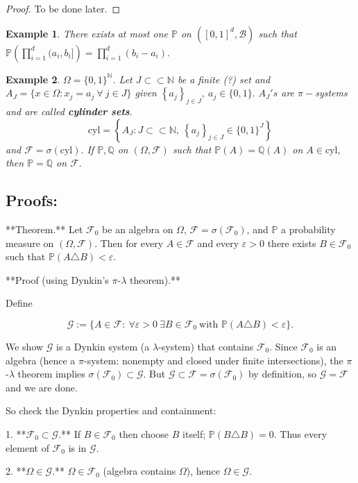 \documentclass{article}
\newcommand{\1}{\mathds{1}}
\newcommand{\Q}{\mathbb{Q}}
\newcommand{\N}{\mathbb{N}}
\newcommand{\F}{\mathcal{F}}
\newcommand{\B}{\mathcal{B}}
\newcommand{\PB}{\mathbb{P}}
\newcommand{\lf}{\left}
\newcommand{\rg}{\right}
\newcommand{\en}[3]{\lf\{{#1}_{#2}\rg\}_{#2\in #3}}
\newtheorem{example}{Example}
\begin{document}
\begin{proof}
   To be done later.
\end{proof}
\begin{example}
There exists at most one $\PB$ on $([0,1]^d,\B)$ such that $\PB\lf(\prod_{i=1}^d(a_i,b_i]\rg)=\prod_{i=1}^d(b_i-a_i).$
\end{example}
\begin{example}
$\Omega=\{0,1\}^\N.$ Let $J\subset\subset \N$ be a finite (?) set and $A_J=\{x\in\Omega:x_j=a_j\ \forall\ j\in J\}$ given $\en ajJ,\ a_j\in\{0,1\}.$
$A_J's$ are $\pi-$systems and are called \textbf{cylinder sets}. $$\text{cyl}=\lf\{A_J:J\subset\subset\N,\ \en ajJ\in\{0,1\}^J\rg\}$$ and $\F=\sigma(\text{cyl}).$ If $\PB,\Q$ on $(\Omega,\F)$ such that $\PB(A)=\Q(A)$ on $A\in\text{cyl},$ then $\PB=\Q$ on $\F.$
\end{example}
\subsection{Proofs:}
**Theorem.**
Let $\mathcal F_0$ be an algebra on $\Omega$, $\mathcal F=\sigma(\mathcal F_0)$, and $\mathbb P$ a probability measure on $(\Omega,\mathcal F)$. Then for every $A\in\mathcal F$ and every $\varepsilon>0$ there exists $B\in\mathcal F_0$ such that $\mathbb P(A\triangle B)<\varepsilon$.

**Proof (using Dynkin’s $\pi$-$\lambda$ theorem).**

Define

$$
\mathcal G:=\Big\{A\in\mathcal F:\ \forall\varepsilon>0\ \exists B\in\mathcal F_0\ \text{with }\mathbb P(A\triangle B)<\varepsilon\Big\}.
$$

We show $\mathcal G$ is a Dynkin system (a $\lambda$-system) that contains $\mathcal F_0$. Since $\mathcal F_0$ is an algebra (hence a $\pi$-system: nonempty and closed under finite intersections), the $\pi$-$\lambda$ theorem implies $\sigma(\mathcal F_0)\subset\mathcal G$. But $\mathcal G\subset\mathcal F=\sigma(\mathcal F_0)$ by definition, so $\mathcal G=\mathcal F$ and we are done.

So check the Dynkin properties and containment:

1. **$\mathcal F_0\subset\mathcal G$.**
   If $B\in\mathcal F_0$ then choose $B$ itself; $\mathbb P(B\triangle B)=0$. Thus every element of $\mathcal F_0$ is in $\mathcal G$.

2. **$\Omega\in\mathcal G$.**
   $\Omega\in\mathcal F_0$ (algebra contains $\Omega$), hence $\Omega\in\mathcal G$.
\end{document}
